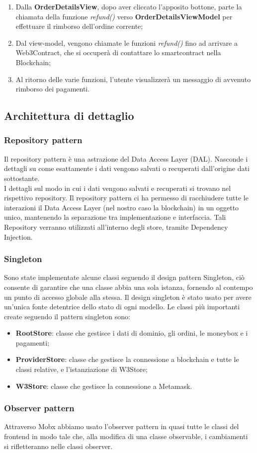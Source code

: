 \begin{enumerate}
    \item Dalla \textbf{OrderDetailsView}, dopo aver cliccato l'apposito bottone, parte la chiamata della funzione \textit{refund()} verso \textbf{OrderDetailsViewModel} per effettuare il rimborso dell'ordine corrente;
    \item Dal view-model, vengono chiamate le funzioni \textit{refund()} fino ad arrivare a Web3Contract, che si occuperà di contattare lo smartcontract nella Blockchain;
    \item Al ritorno delle varie funzioni, l'utente visualizzerà un messaggio di avvenuto rimborso dei pagamenti.
\end{enumerate}

\clearpage
\subsection{Architettura di dettaglio}

\subsubsection{Repository pattern}

Il repository pattern è una astrazione del Data Access Layer (DAL\glo). Nasconde i dettagli su come esattamente i dati vengono salvati o recuperati dall'origine dati sottostante.\\
I dettagli sul modo in cui i dati vengono salvati e recuperati si trovano nel rispettivo repository.
Il repository pattern ci ha permesso di racchiudere tutte le interazioni il Data Access Layer (nel nostro caso la blockchain) in un oggetto unico, mantenendo la separazione tra implementazione e interfaccia. Tali Repository verranno utilizzati all’interno degli store, tramite Dependency Injection\glo.

\subsubsection{Singleton}

Sono state implementate alcune classi seguendo il design pattern Singleton,
 ciò consente di garantire che una classe abbia una sola istanza, fornendo al contempo un punto di accesso globale alla stessa.
Il design singleton è stato usato per avere un'unica fonte detentrice dello stato di ogni modello.
Le classi più importanti create seguendo il pattern singleton sono:

\begin{itemize}
    \item \textbf{RootStore}: classe che gestisce i dati di dominio, gli ordini, le moneybox e i pagamenti;
    \item \textbf{ProviderStore}: classe che gestisce la connessione a blockchain e tutte le classi relative, e l'istanziazione di W3Store;
    \item \textbf{W3Store}: classe che gestisce la connessione a Metamask.
\end{itemize}

\subsubsection{Observer pattern}

Attraverso Mobx abbiamo usato l'observer pattern in quasi tutte le classi del frontend in modo tale che, alla modifica di una classe observable, i cambiamenti si rifletteranno nelle classi observer.